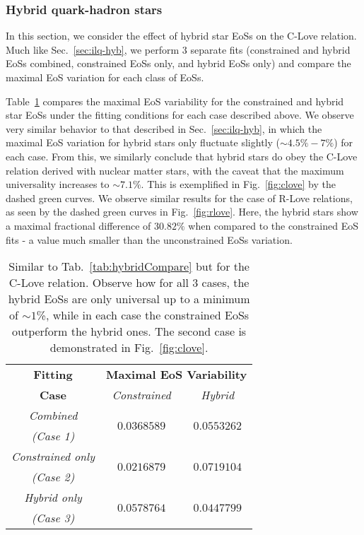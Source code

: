 \documentclass[prd,twocolumn,nofootinbib,superscriptaddress,amsmath,amssymb]{revtex4-1}
\begin{document}
\subsubsection{Hybrid quark-hadron stars}\label{sec:clove-hyb}
In this section, we consider the effect of hybrid star EoSs on the C-Love relation.
Much like Sec.~\ref{sec:ilq-hyb}, we perform 3 separate fits (constrained and hybrid EoSs combined, constrained EoSs only, and hybrid EoSs only) and compare the maximal EoS variation for each class of EoSs.

Table~\ref{tab:hybridCompareClove} compares the maximal EoS variability for the constrained and hybrid star EoSs under the fitting conditions for each case described above. 
We observe very similar behavior to that described in Sec.~\ref{sec:ilq-hyb}, in which the maximal EoS variation for hybrid stars only fluctuate slightly ($\sim 4.5\% - 7\%$) for each case.
From this, we similarly conclude that hybrid stars do obey the C-Love relation derived with nuclear matter stars, with the caveat that the maximum universality increases to $\sim 7.1\%$.
This is exemplified in Fig.~\ref{fig:clove} by the dashed green curves.
We observe similar results for the case of R-Love relations, as seen by the dashed green curves in Fig.~\ref{fig:rlove}.
Here, the hybrid stars show a maximal fractional difference of $30.82\%$ when compared to the constrained EoS fits - a value much smaller than the unconstrained EoSs variation.

{}

\begin{table}
\centering
\caption{
Similar to Tab.~\ref{tab:hybridCompare} but for the C-Love relation.
Observe how for all 3 cases, the hybrid EoSs are only universal up to a minimum of $\sim1$\%, while in each case the constrained EoSs outperform the hybrid ones.
The second case is demonstrated in Fig.~\ref{fig:clove}.
}\label{tab:hybridCompareClove}
\begin{tabular}{ c  || c c } 
 \hline
 \hline
 \textbf{Fitting} & \multicolumn{2}{c}{\textbf{Maximal EoS Variability}} \\
 \cline{2-3}
 \textbf{Case} &  \multicolumn{1}{c|}{\emph{Constrained}} & \emph{Hybrid}\\
 \hline
 \emph{Combined} &  \multirow{2}{*}{$0.0368589$} & \multirow{2}{*}{$0.0553262$}\\
 \emph{(Case 1)} & &\\
 \cline{1-1}
 \emph{Constrained only} & \multirow{2}{*}{$0.0216879$} & \multirow{2}{*}{$0.0719104$}\\
  \emph{(Case 2)} & &\\
  \cline{1-1}
 \emph{Hybrid only} & \multirow{2}{*}{$0.0578764$} & \multirow{2}{*}{$0.0447799$}\\
  \emph{(Case 3)} & &\\
  \cline{1-1}
\hline
\hline
\end{tabular}
\end{table}
\end{document}
